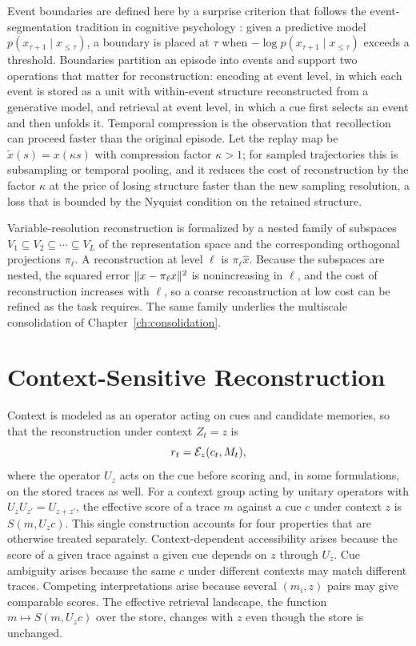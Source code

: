 Event boundaries are defined here by a surprise criterion that follows the event-segmentation tradition in cognitive psychology \cite{zacks2007}: given a predictive model $p(x_{\tau+1}\mid x_{\le\tau})$, a boundary is placed at $\tau$ when $-\log p(x_{\tau+1}\mid x_{\le\tau})$ exceeds a threshold. Boundaries partition an episode into events and support two operations that matter for reconstruction: encoding at event level, in which each event is stored as a unit with within-event structure reconstructed from a generative model, and retrieval at event level, in which a cue first selects an event and then unfolds it. Temporal compression is the observation that recollection can proceed faster than the original episode. Let the replay map be $\tilde x(s)=x(\kappa s)$ with compression factor $\kappa>1$; for sampled trajectories this is subsampling or temporal pooling, and it reduces the cost of reconstruction by the factor $\kappa$ at the price of losing structure faster than the new sampling resolution, a loss that is bounded by the Nyquist condition on the retained structure.

Variable-resolution reconstruction is formalized by a nested family of subspaces $V_1\subseteq V_2\subseteq\cdots\subseteq V_L$ of the representation space and the corresponding orthogonal projections $\pi_\ell$. A reconstruction at level $\ell$ is $\pi_\ell\hat x$. Because the subspaces are nested, the squared error $\lVert x-\pi_\ell x\rVert^2$ is nonincreasing in $\ell$, and the cost of reconstruction increases with $\ell$, so a coarse reconstruction at low cost can be refined as the task requires. The same family underlies the multiscale consolidation of Chapter~\ref{ch:consolidation}.

\chapter{Context-Sensitive Reconstruction}\label{ch:context}

Context is modeled as an operator acting on cues and candidate memories, so that the reconstruction under context $Z_t=z$ is
\begin{equation}\label{eq:context}
r_t=\mathcal{E}_{z}(c_t,M_t),
\end{equation}
where the operator $U_z$ acts on the cue before scoring and, in some formulations, on the stored traces as well. For a context group acting by unitary operators with $U_zU_{z'}=U_{z+z'}$, the effective score of a trace $m$ against a cue $c$ under context $z$ is $S(m,U_zc)$. This single construction accounts for four properties that are otherwise treated separately. Context-dependent accessibility arises because the score of a given trace against a given cue depends on $z$ through $U_z$. Cue ambiguity arises because the same $c$ under different contexts may match different traces. Competing interpretations arise because several $(m_i,z)$ pairs may give comparable scores. The effective retrieval landscape, the function $m\mapsto S(m,U_zc)$ over the store, changes with $z$ even though the store is unchanged.

